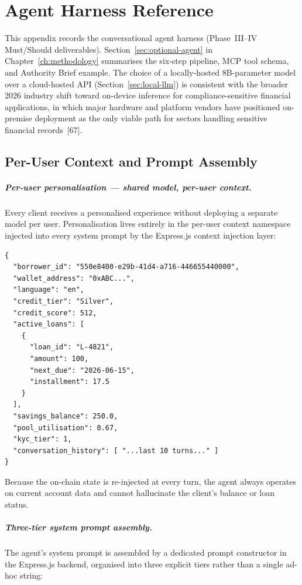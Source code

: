 \documentclass[12pt,a4paper]{report}
\begin{document}
\chapter{Agent Harness Reference}
\label{app:agent-harness}

This appendix records the conversational agent harness (Phase~III--IV Must/Should deliverables). Section~\ref{sec:optional-agent} in Chapter~\ref{ch:methodology} summarises the six-step pipeline, MCP tool schema, and Authority Brief example.
The choice of a locally-hosted 8B-parameter model over a cloud-hosted
API (Section~\ref{sec:local-llm}) is consistent with the broader 2026
industry shift toward on-device inference for compliance-sensitive
financial applications, in which major hardware and platform vendors
have positioned on-premise deployment as the only viable path for
sectors handling sensitive financial records~[67].

\section{Per-User Context and Prompt Assembly}

\paragraph{Per-user personalisation --- shared model, per-user context.}
Every client receives a personalised experience without deploying a separate model per user. Personalisation lives entirely in the per-user context namespace injected into every system prompt by the Express.js context injection layer:

\begin{verbatim}
{
  "borrower_id": "550e8400-e29b-41d4-a716-446655440000",
  "wallet_address": "0xABC...",
  "language": "en",
  "credit_tier": "Silver",
  "credit_score": 512,
  "active_loans": [
    {
      "loan_id": "L-4821",
      "amount": 100,
      "next_due": "2026-06-15",
      "installment": 17.5
    }
  ],
  "savings_balance": 250.0,
  "pool_utilisation": 0.67,
  "kyc_tier": 1,
  "conversation_history": [ "...last 10 turns..." ]
}
\end{verbatim}

\noindent Because the on-chain state is re-injected at every turn, the agent always operates on current account data and cannot hallucinate the client's balance or loan status.

\paragraph{Three-tier system prompt assembly.}
The agent's system prompt is assembled by a dedicated prompt constructor in the Express.js backend, organised into three explicit tiers rather than a single ad-hoc string:
\end{document}
